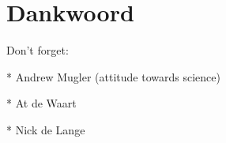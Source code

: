 


\chapter*{Dankwoord}

Don't forget:

* Andrew Mugler (attitude towards science)

* At de Waart

* Nick de Lange